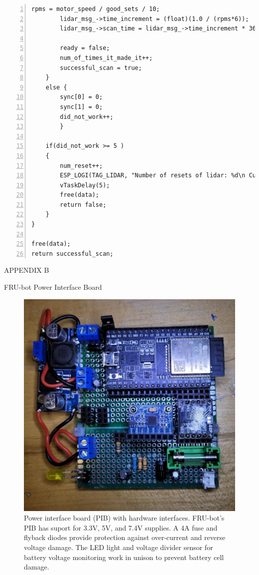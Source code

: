 \documentclass[conference]{IEEEtran}
\begin{document}
\begin{lstlisting}[frame=leftline, breaklines=true, numbers=left, stepnumber=1, numbersep=5pt]
        rpms = motor_speed / good_sets / 10;
        lidar_msg_->time_increment = (float)(1.0 / (rpms*6));
        lidar_msg_->scan_time = lidar_msg_->time_increment * 360;

        ready = false;
        num_of_times_it_made_it++;
        successful_scan = true;
    }  
    else {
        sync[0] = 0;
        sync[1] = 0;
        did_not_work++;
        }

    if(did_not_work >= 5 )
    {
        num_reset++;
        ESP_LOGI(TAG_LIDAR, "Number of resets of lidar: %d\n Current value of conversions: %d", num_reset, num_of_times_it_made_it);
        vTaskDelay(5);
        free(data);
        return false;                      
    }
}

free(data);
return successful_scan;

\end{lstlisting}

\begin{center}APPENDIX B
\end{center}
\begin{center}FRU-bot Power Interface Board
\end{center}
\begin{figure}[H]
	\includegraphics[width=\linewidth]{./figs/circuit.png}
	\caption{Power interface board (PIB) with hardware interfaces. FRU-bot's PIB has suport for 3.3V, 5V, and 7.4V supplies. A 4A fuse and flyback diodes provide protection against over-current and reverse voltage damage. The LED light and voltage divider sensor for battery voltage monitoring work in unison to prevent battery cell damage.}
\end{figure}
\end{document}
